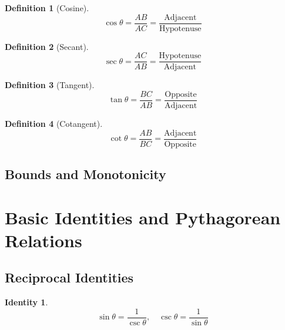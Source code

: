 \documentclass{article}
\theoremstyle{definition}
\newtheorem{definition}{Definition}[]
\theoremstyle{plain}
\newtheorem{identity}{Identity}[]
\begin{document}
\vspace{0.5em}

\noindent
\begin{minipage}[t]{0.48\textwidth}
    \begin{definition}[Cosine]
        \[
        \cos \theta = \frac{AB}{AC} = \frac{\text{Adjacent}}{\text{Hypotenuse}}
        \]
    \end{definition}
\end{minipage}
\hfill
\begin{minipage}[t]{0.48\textwidth}
    \begin{definition}[Secant]
        \[
        \sec \theta = \frac{AC}{AB} = \frac{\text{Hypotenuse}}{\text{Adjacent}}
        \]
    \end{definition}
\end{minipage}

\vspace{0.5em}

\noindent
\begin{minipage}[t]{0.48\textwidth}
    \begin{definition}[Tangent]
        \[
        \tan \theta = \frac{BC}{AB} = \frac{\text{Opposite}}{\text{Adjacent}}
        \]
    \end{definition}
\end{minipage}
\hfill
\begin{minipage}[t]{0.48\textwidth}
    \begin{definition}[Cotangent]
        \[
        \cot \theta = \frac{AB}{BC} = \frac{\text{Adjacent}}{\text{Opposite}}
        \]
    \end{definition}
\end{minipage}

\subsection{Bounds and Monotonicity}

\section{Basic Identities and Pythagorean Relations}

\subsection{Reciprocal Identities}

\begin{identity}
    \[
    \sin \theta = \frac{1}{\csc \theta}, \quad \csc \theta = \frac{1}{\sin \theta}
    \]
\end{identity}
\end{document}

